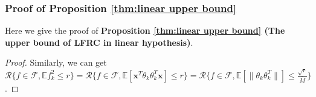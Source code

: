 \documentclass{article}
\def\vx{{\mathbf{x}}}
\def\eE{\mathbb{E}}
\def\defone{\overset{\text{\ding{172}}}{=}}
\begin{document}
\subsubsection{Proof of Proposition \ref{thm:linear upper bound}}
\label{pro:proposition3_proof}
Here we give the proof of \textbf{Proposition \ref{thm:linear upper bound} (The upper bound of LFRC in linear hypothesis)}.
\begin{proof} 
Similarly, we can get $\mathcal{R}\{ f \in \mathcal{F}, \eE f_k^2 \leq r \}  = \mathcal{R} \{ f \in \mathcal{F}, \eE [\vx^T \theta_k \theta_k^T \vx] \leq r \} 
    = \mathcal{R} \{ f \in \mathcal{F}, \eE [\| \theta_k \theta_k^T \|] \leq \frac{\sqrt{r}}{\bar{M}} \}$.  

\end{proof}
\end{document}
